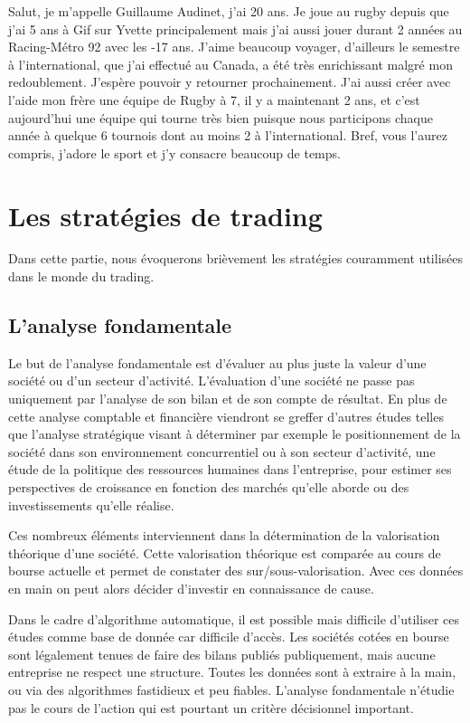 \documentclass[a4paper,12pt]{article}
\begin{document}
Salut, je m'appelle Guillaume Audinet, j'ai 20 ans. Je joue au rugby depuis que j'ai 5 ans à Gif sur Yvette principalement mais j'ai aussi jouer durant 2 années au Racing-Métro 92 avec les -17 ans. J'aime beaucoup voyager, d'ailleurs le semestre à l'international, que j'ai effectué au Canada, a été très enrichissant malgré mon redoublement. J'espère pouvoir y retourner prochainement.
J'ai aussi créer avec l'aide mon frère une équipe de Rugby à 7, il y a maintenant 2 ans, et c'est aujourd'hui une équipe qui tourne très bien puisque nous participons chaque année à quelque 6 tournois dont au moins 2 à l'international.
Bref, vous l'aurez compris, j'adore le sport et j'y consacre beaucoup de temps.

\newpage

\section{Les stratégies de trading}

Dans cette partie, nous évoquerons brièvement les stratégies couramment utilisées dans le monde du trading. 

\subsection{L'analyse fondamentale}
Le but de l'analyse fondamentale est d'évaluer au plus juste la valeur d'une société ou d'un secteur d'activité. L'évaluation d'une société ne passe pas uniquement par l'analyse de son bilan et de son compte de résultat. En plus de cette analyse comptable et financière viendront se greffer d'autres études telles que l'analyse stratégique visant à déterminer par exemple le positionnement de la société dans son environnement concurrentiel ou à son secteur d'activité, une étude de la politique des ressources humaines dans l'entreprise, pour estimer ses perspectives de croissance en fonction des marchés qu'elle aborde ou des investissements qu'elle réalise. 

Ces nombreux éléments interviennent dans la détermination de la valorisation théorique d'une société. Cette valorisation théorique est comparée au cours de bourse actuelle et permet de constater des sur/sous-valorisation. Avec ces données en main on peut alors décider d'investir en connaissance de cause. 

Dans le cadre d'algorithme automatique, il est possible mais difficile d'utiliser ces études comme base de donnée car difficile d'accès. Les sociétés cotées en bourse sont légalement tenues de faire des bilans publiés publiquement, mais aucune entreprise ne respect une structure. Toutes les données sont à extraire à la main, ou via des algorithmes fastidieux et peu fiables. L'analyse fondamentale n'étudie pas le cours de l'action qui est pourtant un critère décisionnel important.
\end{document}
